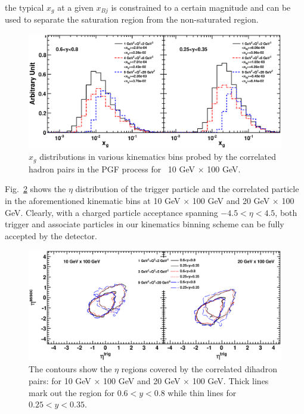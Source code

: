the typical $x_{g}$ at a given $x_{Bj}$ is constrained to a certain magnitude and can be used to
separate the saturation region from the non-saturated region.
\begin{figure}
\begin{center}
\includegraphics[width=1.0\textwidth]{plots/chpt6/ep_10x100_xg_distribution_multibins.eps} 
\end{center} 
\caption[$x_{g}$ coverage distribution constrained in various kinematic bins]{$x_{g}$ distributions in various kinematics bins
probed by the correlated hadron pairs in the PGF process for \ep\ 10 GeV
$\times$ 100 GeV. }
\label{fig:xgCover} 
\end{figure}
Fig.~\ref{fig:pairEta} shows the $\eta$ distribution of the trigger
particle and the correlated particle in the aforementioned kinematic
bins at 10 GeV $\times$ 100 GeV and 20 GeV $\times$ 100 GeV. Clearly, with a
charged particle acceptance spanning $-4.5<\eta<4.5$, both trigger and
associate particles in our kinematics binning scheme can be fully accepted by
the detector.
\begin{figure}
\begin{center}
\includegraphics[width=1.0\textwidth]{plots/chpt6/ep_10And20x100_trig_2_asso_1_z_0.2_0.4_multiBin_etaCorre.eps}
\end{center} 
\caption[$\eta$ distribution of the trigger/associate particles in the dihadron pairs]{The contours show the
$\eta$ regions covered by the correlated dihadron pairs: for 10 GeV $\times$ 100
GeV and 20 GeV $\times$ 100 GeV. Thick lines mark out the region for $0.6<y<0.8$
while thin lines for $0.25<y<0.35$.}
\label{fig:pairEta} 
\end{figure}


